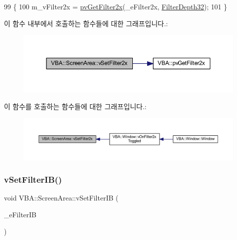 \begin{DoxyCode}
99 \{
100   m\_vFilter2x = \mbox{\hyperlink{namespace_v_b_a_a2a6c0188179e4ee017369e21d8e6f268}{pvGetFilter2x}}(\_eFilter2x, \mbox{\hyperlink{class_v_b_a_a6ec41ea038b4ea42eb8d9ea59d3eb4c5a5f5e047b6fb2c818c71882c4b3f3fc0c}{FilterDepth32}});
101 \}
\end{DoxyCode}
이 함수 내부에서 호출하는 함수들에 대한 그래프입니다.\+:
\nopagebreak
\begin{figure}[H]
\begin{center}
\leavevmode
\includegraphics[width=350pt]{class_v_b_a_1_1_screen_area_ad42090409e7ddec2c1cd9d715a38f8d9_cgraph}
\end{center}
\end{figure}
이 함수를 호출하는 함수들에 대한 그래프입니다.\+:
\nopagebreak
\begin{figure}[H]
\begin{center}
\leavevmode
\includegraphics[width=350pt]{class_v_b_a_1_1_screen_area_ad42090409e7ddec2c1cd9d715a38f8d9_icgraph}
\end{center}
\end{figure}
\mbox{\label{class_v_b_a_1_1_screen_area_a7a23a673843050e232e83588cfab81ce}} 
\subsubsection{\texorpdfstring{v\+Set\+Filter\+I\+B()}{vSetFilterIB()}}
{\footnotesize\ttfamily void V\+B\+A\+::\+Screen\+Area\+::v\+Set\+Filter\+IB (\begin{DoxyParamCaption}\item[{\mbox{\hyperlink{class_v_b_a_a304ffeb9f4a8b26e7fa4e2eb620d780f}{E\+Filter\+IB}}}]{\+\_\+e\+Filter\+IB }\end{DoxyParamCaption})}



